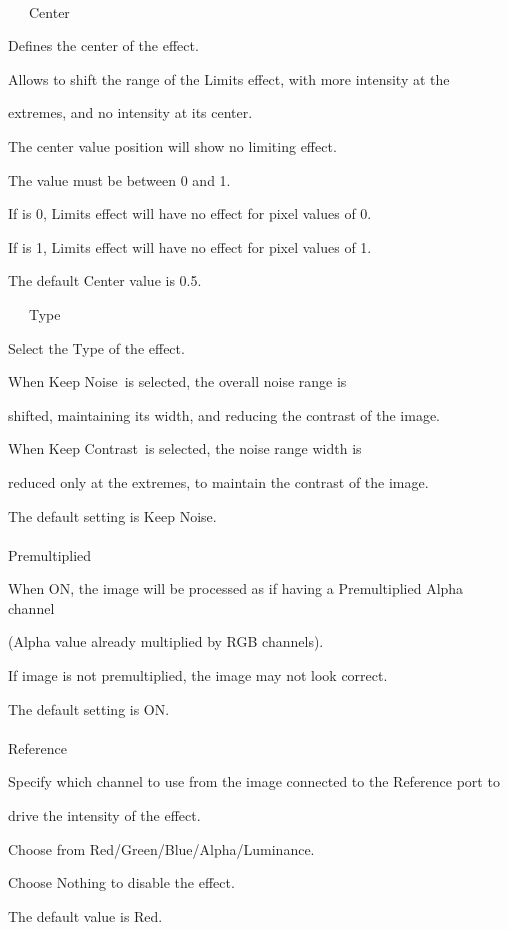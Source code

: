 \documentclass[a4paper,12pt]{article}
\begin{document}
\ \vspace{-0.2em}
\par
\noindent \ \ \, Center\par
Defines the center of the effect.\par
Allows to shift the range of the Limits effect, with more intensity at the\par 
extremes, and no intensity at its center.\par
The center value position will show no limiting effect.\par
The value must be between 0 and 1.\par
If is 0, Limits effect will have no effect for pixel values of 0.\par
If is 1, Limits effect will have no effect for pixel values of 1.\par
The default Center value is 0.5.\\
\par
\noindent \ \ \, Type\par
Select the Type of the effect.\par
When \textquotedbl Keep Noise\textquotedbl\ is selected, the overall noise range is\par 
shifted, maintaining its width, and reducing the contrast of the image.\par
When \textquotedbl Keep Contrast\textquotedbl\ is selected, the noise range width is\par 
reduced only at the extremes, to maintain the contrast of the image.\par
The default setting is \textquotedbl Keep Noise\textquotedbl .\\
\\
Premultiplied\par
When ON, the image will be processed as if having a Premultiplied Alpha channel\par 
(Alpha value already multiplied by RGB channels).\par
If image is not premultiplied, the image may not look correct.\par
The default setting is ON.\\
\\
Reference\par
Specify which channel to use from the image connected to the Reference port to\par 
drive the intensity of the effect.\par
Choose from Red/Green/Blue/Alpha/Luminance.\par
Choose Nothing to disable the effect.\par
The default value is \textquotedbl Red\textquotedbl .
\end{document}
